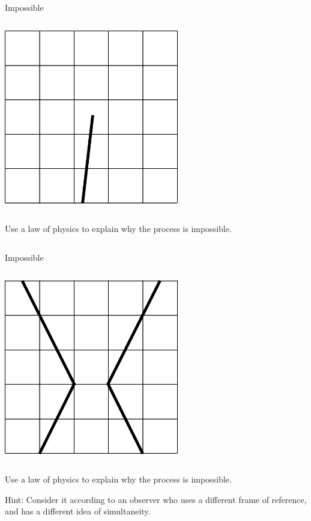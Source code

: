 \begin{frame}{Impossible}


  \begin{mycolumns}

    \begin{column}{.3\textwidth}\includegraphics[width=3in]{ch06/figs/impossible-2}\end{column}

    \begin{column}{.7\textwidth}

      Use a law of physics to explain why the process is impossible.

    \end{column}
  \end{mycolumns}

\end{frame}

\begin{frame}{Impossible}


  \begin{mycolumns}

    \begin{column}{.3\textwidth}\includegraphics[width=3in]{ch06/figs/impossible-3}\end{column}

    \begin{column}{.7\textwidth}

      Use a law of physics to explain why the process is impossible.

      Hint: Consider it according to an observer who uses a different frame of reference, and has a different
      idea of simultaneity.

    \end{column}
  \end{mycolumns}

\end{frame}

